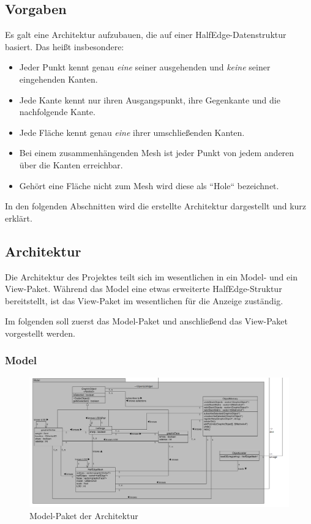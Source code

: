 \subsection{Vorgaben}
Es galt eine Architektur aufzubauen, die auf einer HalfEdge-Datenstruktur basiert. Das heißt insbesondere:
\begin{itemize}
\item Jeder Punkt kennt genau \textit{eine} seiner ausgehenden und \textit{keine} seiner eingehenden Kanten.
\item Jede Kante kennt nur ihren Ausgangspunkt, ihre Gegenkante und die nachfolgende Kante.
\item Jede Fläche kennt genau \textit{eine} ihrer umschließenden Kanten. 
\item Bei einem zusammenhängenden Mesh ist jeder Punkt von jedem anderen über die Kanten erreichbar.
\item Gehört eine Fläche nicht zum Mesh wird diese als ``Hole`` bezeichnet.
\end{itemize}
In den folgenden Abschnitten wird die erstellte Architektur dargestellt und kurz erklärt.

\subsection{Architektur}
Die Architektur des Projektes teilt sich im wesentlichen in ein Model- und ein View-Paket. 
Während das Model eine etwas erweiterte HalfEdge-Struktur bereitstellt, ist das View-Paket im wesentlichen für die Anzeige zuständig. 

Im folgenden soll zuerst das Model-Paket und anschlie\ss{}end das View-Paket vorgestellt werden.

\subsubsection{Model}
\begin{figure}[htbp]
\centering
\includegraphics[angle=90,scale=0.5]{content/pictures/architekturModel.png}
\caption{Model-Paket der Architektur}
\label{fig:model}
\end{figure}

